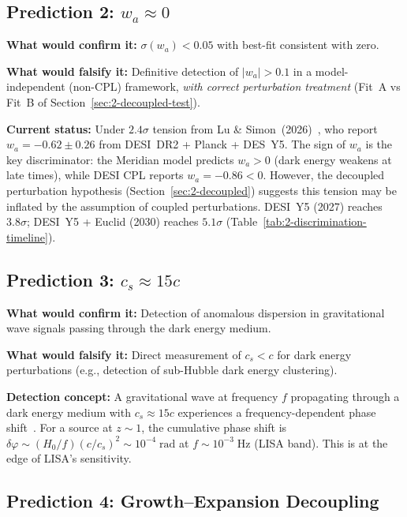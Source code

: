 \subsection{Prediction 2: $w_a \approx 0$}
\label{sec:2-pred2}

\textbf{What would confirm it:} $\sigma(w_a) < 0.05$ with best-fit consistent with zero.

\textbf{What would falsify it:} Definitive detection of $|w_a| > 0.1$ in a model-independent (non-CPL) framework, \emph{with correct perturbation treatment} (Fit~A vs Fit~B of Section~\ref{sec:2-decoupled-test}).

\textbf{Current status:} Under $2.4\sigma$ tension from Lu \& Simon~(2026)~\cite{ch2:LuSimon2026}, who report $w_a = -0.62 \pm 0.26$ from DESI~DR2 + Planck + DES~Y5. The sign of $w_a$ is the key discriminator: the Meridian model predicts $w_a > 0$ (dark energy weakens at late times), while DESI CPL reports $w_a = -0.86 < 0$. However, the decoupled perturbation hypothesis (Section~\ref{sec:2-decoupled}) suggests this tension may be inflated by the assumption of coupled perturbations. DESI~Y5 (2027) reaches $3.8\sigma$; DESI~Y5 + Euclid (2030) reaches $5.1\sigma$ (Table~\ref{tab:2-discrimination-timeline}).

\subsection{Prediction 3: $c_s \approx 15c$}
\label{sec:2-pred3}

\textbf{What would confirm it:} Detection of anomalous dispersion in gravitational wave signals passing through the dark energy medium.

\textbf{What would falsify it:} Direct measurement of $c_s < c$ for dark energy perturbations (e.g., detection of sub-Hubble dark energy clustering).

\textbf{Detection concept:} A gravitational wave at frequency $f$ propagating through a dark energy medium with $c_s \approx 15c$ experiences a frequency-dependent phase shift~\cite{ch2:Amendola2018}. For a source at $z \sim 1$, the cumulative phase shift is $\delta\varphi \sim (H_0/f)(c/c_s)^2 \sim 10^{-4}\;\mathrm{rad}$ at $f \sim 10^{-3}\;\mathrm{Hz}$ (LISA band). This is at the edge of LISA's sensitivity.

\subsection{Prediction 4: Growth--Expansion Decoupling}
\label{sec:2-pred4}

